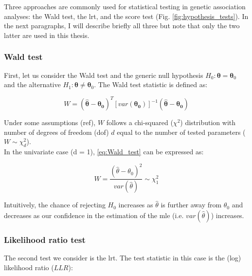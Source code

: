 
\vspace{5mm}

Three approaches are commonly used for statistical testing in genetic association analyses: the Wald test, the \gls{lrt}, and the score test     (Fig. \ref{fig:hypothesis_tests}).
In the next paragraphs, I will describe briefly all three but note that only the two latter are used in this thesis.

\subsubsection{Wald test}

First, let us consider the Wald test and the generic null hypothesis $H_0: \boldsymbol{\theta} = \boldsymbol{\theta}_0$ and the alternative $H_1: \boldsymbol{\theta} \neq \boldsymbol{\theta}_0$.
The Wald test statistic is defined as:

\begin{equation}\label{eq:Wald_test}
W = (\hat{\boldsymbol{\theta}}-\boldsymbol{\theta_0})^T [var(\boldsymbol{\theta_0})]^{-1}(\hat{\boldsymbol{\theta}}-\boldsymbol{\theta_0}) 
\end{equation}

Under some assumptions (ref), $W$ follows a chi-squared ($\chi^2$) distribution with number of degrees of freedom (dof) $d$ equal to the number of tested parameters ($W \sim \chi^2_d $).\\

In the univariate case (d = 1), \eqref{eq:Wald_test} can be expressed as:

\begin{equation}\label{eq:Wald_test_univariate}
    W = \frac{(\hat{\theta}-\theta_0)^2}{var(\hat{\theta})} \sim \chi^2_1
\end{equation}

Intuitively, the chance of rejecting $H_0$ increases as $\hat{\theta}$ is further away from $\theta_0$
and decreases as our confidence in the estimation of the \gls{mle} (i.e. $var(\hat{\theta})$) increases.


\subsubsection{Likelihood ratio test}

The second test we consider is the \gls{lrt}.
The test statistic in this case is the (log) likelihood ratio ($LLR$):

